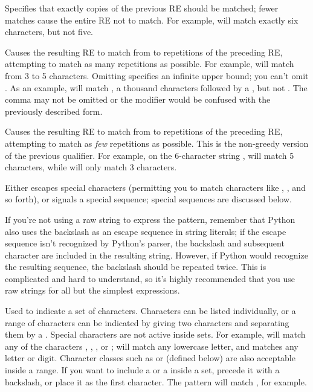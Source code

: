 \begin{list}{}{\leftmargin 0.7in }
\item[\code{\{\var{m}\}}]
Specifies that exactly  copies of the previous RE should be
matched; fewer matches cause the entire RE not to match.  For example,
 will match exactly six  characters, but
not five.

\item[\code{\{\var{m},\var{n}\}}] Causes the resulting RE to match from
 to  repetitions of the preceding RE, attempting to
match as many repetitions as possible.  For example, 
will match from 3 to 5  characters.  Omitting 
specifies an infinite upper bound; you can't omit .  As an
example,  will match , a thousand
 characters followed by a , but not .
The comma may not be omitted or the modifier would be confused with
the previously described form.

\item[\code{\{\var{m},\var{n}\}?}] Causes the resulting RE to
match from  to  repetitions of the preceding RE,
attempting to match as \emph{few} repetitions as possible.  This is
the non-greedy version of the previous qualifier.  For example, on the
6-character string ,  will match 5
 characters, while  will only match 3
characters.

\item[\character{\e}] Either escapes special characters (permitting
you to match characters like \character{*}, , and so
forth), or signals a special sequence; special sequences are discussed
below.

If you're not using a raw string to
express the pattern, remember that Python also uses the
backslash as an escape sequence in string literals; if the escape
sequence isn't recognized by Python's parser, the backslash and
subsequent character are included in the resulting string.  However,
if Python would recognize the resulting sequence, the backslash should
be repeated twice.  This is complicated and hard to understand, so
it's highly recommended that you use raw strings for all but the
simplest expressions.

\item[\code{[]}] Used to indicate a set of characters.  Characters can
be listed individually, or a range of characters can be indicated by
giving two characters and separating them by a \character{-}.  Special
characters are not active inside sets.  For example, \regexp{[akm\$]}
will match any of the characters , ,
, or \character{\$}; \regexp{[a-z]}
will match any lowercase letter, and \code{[a-zA-Z0-9]} matches any
letter or digit.  Character classes such as  or 
(defined below) are also acceptable inside a range.  If you want to
include a \character{]} or a \character{-} inside a set, precede it with a
backslash, or place it as the first character.  The
pattern \regexp{[]]} will match \code{']'}, for example.


\end{list}

